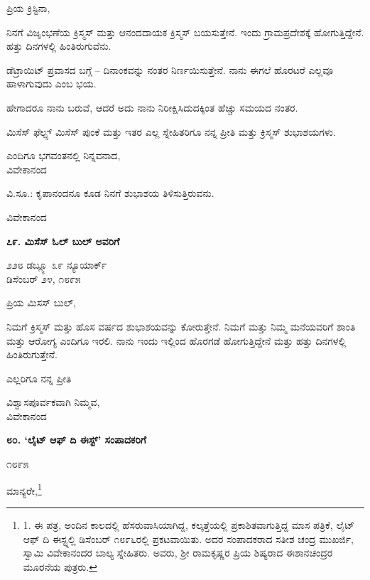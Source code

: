 ಪ್ರಿಯ ಕ್ರಿಸ್ಟಿನಾ,

ನಿನಗೆ ವಿಜೃಂಭಣೆಯ ಕ್ರಿಸ್ಮಸ್ ಮತ್ತು ಆನಂದದಾಯಕ ಕ್ರಿಸ್ಮಸ್ ಬಯಸುತ್ತೇನೆ. ಇಂದು ಗ್ರಾಮಪ್ರದೇಶಕ್ಕೆ ಹೋಗುತ್ತಿದ್ದೇನೆ. ಹತ್ತು ದಿನಗಳಲ್ಲಿ ಹಿಂತಿರುಗುವೆನು.

ಡೆಟ್ರಾಯಿಟ್ ಪ್ರವಾಸದ ಬಗ್ಗೆ – ದಿನಾಂಕವನ್ನು ನಂತರ ನಿರ್ಣಯಿಸುತ್ತೇನೆ. ನಾನು ಈಗಲೆ ಹೊರಟರೆ ಎಲ್ಲವೂ ಹಾಳಾಗುವುದು ಎಂಬ ಭಯ.

ಹೇಗಾದರೂ ನಾನು ಬರುವೆ, ಆದರೆ ಅದು ನಾನು ನಿರೀಕ್ಷಿಸಿದುದಕ್ಕಿಂತ ಹೆಚ್ಚು ಸಮಯದ ನಂತರ.

ಮಿಸೆಸ್ ಫೆಲ್ಪ್ಸ್ ಮಿಸೆಸ್ ಪುಂಕೆ ಮತ್ತು ಇತರ ಎಲ್ಲ ಸ್ನೇಹಿತರಿಗೂ ನನ್ನ ಪ್ರೀತಿ ಮತ್ತು ಕ್ರಿಸ್ಮಸ್ ಶುಭಾಶಯಗಳು.

\begin{flushright}
ಎಂದಿಗೂ ಭಗವಂತನಲ್ಲಿ ನಿನ್ನವನಾದ,\\ವಿವೇಕಾನಂದ
\end{flushright}

ವಿ.ಸೂ.: ಕೃಪಾನಂದನೂ ಕೂಡ ನಿನಗೆ ಶುಭಾಶಯ ತಿಳಿಸುತ್ತಿರುವನು.

\begin{flushright}
ವಿವೇಕಾನಂದ
\end{flushright}

\begin{center}
\textbf{೭೯. ಮಿಸೆಸ್ ಓಲ್ ಬುಲ್ ಅವರಿಗೆ}
\end{center}

\begin{flushright}
೨೨೮ ಡಬ್ಲ್ಯೂ ೩೯ ನ್ಯೂಯಾರ್ಕ್\\ಡಿಸೆಂಬರ್ ೨೪, ೧೮೯೫
\end{flushright}

ಪ್ರಿಯ ಮಿಸಸ್ ಬುಲ್,

ನಿಮಗೆ ಕ್ರಿಸ್ಮಸ್ ಮತ್ತು ಹೊಸ ವರ್ಷದ ಶುಭಾಶಯವನ್ನು ಕೋರುತ್ತೇನೆ. ನಿಮಗೆ ಮತ್ತು ನಿಮ್ಮ ಮನೆಯವರಿಗೆ ಶಾಂತಿ ಮತ್ತು ಆರೋಗ್ಯ ಎಂದಿಗೂ ಇರಲಿ. ನಾನು ಇಂದು ಇಲ್ಲಿಂದ ಹೊರಗಡೆ ಹೋಗುತ್ತಿದ್ದೇನೆ ಮತ್ತು ಹತ್ತು ದಿನಗಳಲ್ಲಿ ಹಿಂತಿರುಗುತ್ತೇನೆ.

ಎಲ್ಲರಿಗೂ ನನ್ನ ಪ್ರೀತಿ

\begin{flushright}
ವಿಶ್ವಾಸಪೂರ್ವಕವಾಗಿ ನಿಮ್ಮವ,\\ವಿವೇಕಾನಂದ
\end{flushright}

\begin{center}
\textbf{೮೦. ‘ಲೈಟ್ ಆಫ್ ದಿ ಈಸ್ಟ್’ ಸಂಪಾದಕರಿಗೆ}
\end{center}

\begin{flushright}
೧೮೯೫
\end{flushright}

ಮಾನ್ಯರೇ,\footnote{1. ಈ ಪತ್ರ, ಅಂದಿನ ಕಾಲದಲ್ಲಿ ಹೆಸರುವಾಸಿಯಾಗಿದ್ದ, ಕಲ್ಕತ್ತೆಯಲ್ಲಿ ಪ್ರಕಾಶಿತವಾಗುತ್ತಿದ್ದ ಮಾಸ ಪತ್ರಿಕೆ, ಲೈಟ್ ಆಫ್ ದಿ ಈಸ್ಟ್ನಲ್ಲಿ ಡಿಸೆಂಬರ್ ೧೮೯೬ರಲ್ಲಿ ಪ್ರಕಟವಾಯಿತು. ಅದರ ಸಂಪಾದಕರಾದ ಸತೀಶ ಚಂದ್ರ ಮುಖರ್ಜಿ, ಸ್ವಾಮಿ ವಿವೇಕಾನಂದರ ಬಾಲ್ಯ ಸ್ನೇಹಿತರು. ಅವರು, ಶ‍್ರೀ ರಾಮಕೃಷ್ಣರ ಪ್ರಿಯ ಶಿಷ್ಯರಾದ ಈಶಾನಚಂದ್ರರ ಮೂರನೆಯ ಪುತ್ರರು.}

